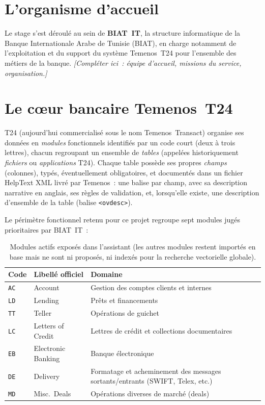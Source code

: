 ﻿\documentclass[12pt,a4paper]{report}
\newcommand{\code}[1]{\texttt{\color{biatbluedk}#1}}
\newcommand{\ph}[1]{\textit{\color{mutedgray}[#1]}}
\begin{document}
\section{L'organisme d'accueil}
Le stage s'est déroulé au sein de \textbf{BIAT~IT}, la structure informatique de la Banque Internationale Arabe de Tunisie (BIAT), en charge notamment de l'exploitation et du support du système Temenos~T24 pour l'ensemble des métiers de la banque. \ph{Compléter ici~: équipe d'accueil, missions du service, organisation.}

\section{Le cœur bancaire Temenos~T24}
T24 (aujourd'hui commercialisé sous le nom Temenos~Transact) organise ses données en \emph{modules} fonctionnels identifiés par un code court (deux à trois lettres), chacun regroupant un ensemble de \emph{tables} (appelées historiquement \emph{fichiers} ou \emph{applications} T24). Chaque table possède ses propres \emph{champs} (colonnes), typés, éventuellement obligatoires, et documentés dans un fichier HelpText XML livré par Temenos~: une balise par champ, avec sa description narrative en anglais, ses règles de validation, et, lorsqu'elle existe, une description d'ensemble de la table (balise \code{<ovdesc>}).

Le périmètre fonctionnel retenu pour ce projet regroupe sept modules jugés prioritaires par BIAT~IT~:

\begin{table}[h]
\centering
\caption{Modules actifs exposés dans l'assistant (les autres modules restent importés en base mais ne sont ni proposés, ni indexés pour la recherche vectorielle globale).}
\begin{tabular}{@{}lll@{}}
\toprule
\textbf{Code} & \textbf{Libellé officiel} & \textbf{Domaine} \\
\midrule
\code{AC} & Account & Gestion des comptes clients et internes \\
\code{LD} & Lending & Prêts et financements \\
\code{TT} & Teller & Opérations de guichet \\
\code{LC} & Letters of Credit & Lettres de crédit et collections documentaires \\
\code{EB} & Electronic Banking & Banque électronique \\
\code{DE} & Delivery & Formatage et acheminement des messages sortants/entrants (SWIFT, Telex, etc.) \\
\code{MD} & Misc.\ Deals & Opérations diverses de marché (deals) \\
\bottomrule
\end{tabular}
\end{table}
\end{document}
